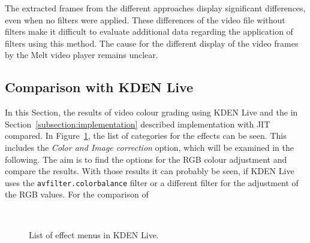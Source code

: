 \documentclass[../MasterThesis.tex]{subfiles}
\begin{document}
\vspace*{2em}
The extracted frames from the different approaches display significant differences, even when no filters were applied. 
These differences of the video file without filters make it difficult to evaluate additional data regarding the application of filters using this method. The cause for the different display of the video frames by the Melt video player remains unclear.














\subsection{Comparison with KDEN Live} \label{section:comparisonKDENLive}


\begin{minipage}{0.48\textwidth}
	
	In this Section, the results of video colour grading using KDEN Live and the in Section~\ref{subsection:implementation} described implementation with JIT compared. In Figure~\ref{figure:kdenlive_effects}, the list of categories for the effects can be seen. This includes the \textit{Color and Image correction} option, which will be examined in the following. The aim is to find the options for the RGB colour adjustment and compare the results. With those results it can probably be seen, if KDEN Live uses the \texttt{avfilter.colorbalance} filter or a different filter for the adjustment of the RGB values. For the comparison of
	
	
\end{minipage}\begin{minipage}{0.04\textwidth}
	\ 
\end{minipage}\begin{minipage}{0.48\textwidth}
	\begin{figure}[H]
		\begin{center}
			\caption[List of effect menus in KDEN Live.]{List of effect menus in KDEN Live.}
			\label{figure:kdenlive_effects}
		\end{center}
	\end{figure}
	\hfill
\end{minipage}
\end{document}
